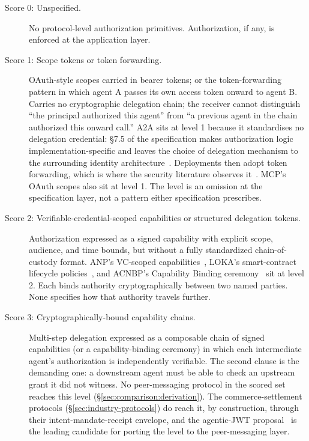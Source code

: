 \begin{description}
  \item[Score 0: Unspecified.] No protocol-level
    authorization primitives. Authorization, if any, is
    enforced at the application layer.
  \item[Score 1: Scope tokens or token forwarding.]
    OAuth-style scopes carried in bearer tokens; or the
    token-forwarding pattern in which agent A passes its
    own access token onward to agent B. Carries no
    cryptographic delegation chain; the receiver cannot
    distinguish ``the principal authorized this agent''
    from ``a previous agent in the chain authorized this
    onward call.'' A2A sits at level 1 because it
    standardises no delegation credential: \S7.5 of the
    specification makes authorization logic
    implementation-specific and leaves the choice of
    delegation mechanism to the surrounding identity
    architecture~\cite{spec_a2a}. Deployments then adopt
    token forwarding, which is where the security
    literature observes it~\cite{authz_propagation,
    agentic_jwt}. MCP's OAuth scopes also sit at level 1.
    The level is an omission at the specification layer,
    not a pattern either specification prescribes.
  \item[Score 2: Verifiable-credential-scoped
    capabilities or structured delegation tokens.]
    Authorization expressed as a signed capability with
    explicit scope, audience, and time bounds, but
    without a fully standardized chain-of-custody format.
    ANP's VC-scoped capabilities~\cite{spec_anp}, LOKA's
    smart-contract lifecycle policies~\cite{spec_loka}, and
    ACNBP's Capability Binding ceremony~\cite{spec_acnbp}
    sit at level 2. Each binds authority cryptographically
    between two named parties. None specifies how that
    authority travels further.
  \item[Score 3: Cryptographically-bound capability
    chains.] Multi-step delegation expressed as a
    composable chain of signed capabilities (or a
    capability-binding ceremony) in which each
    intermediate agent's authorization is independently
    verifiable. The second clause is the demanding one: a
    downstream agent must be able to check an upstream
    grant it did not witness. No peer-messaging protocol in
    the scored set reaches this level
    (\S\ref{sec:comparison:derivation}). The
    commerce-settlement protocols
    (\S\ref{sec:industry-protocols}) do reach it, by
    construction, through their intent-mandate-receipt
    envelope, and the agentic-JWT
    proposal~\cite{agentic_jwt} is the leading candidate
    for porting the level to the peer-messaging layer.
\end{description}

